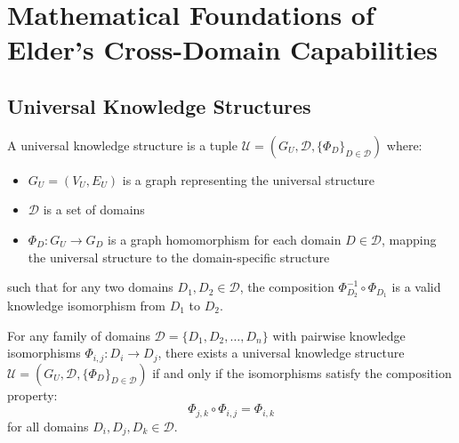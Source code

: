 \section{Mathematical Foundations of Elder's Cross-Domain Capabilities}

\subsection{Universal Knowledge Structures}

\begin{definition}
A universal knowledge structure is a tuple $\mathcal{U} = (G_U, \mathcal{D}, \{\Phi_D\}_{D \in \mathcal{D}})$ where:
\begin{itemize}
    \item $G_U = (V_U, E_U)$ is a graph representing the universal structure
    \item $\mathcal{D}$ is a set of domains
    \item $\Phi_D: G_U \to G_D$ is a graph homomorphism for each domain $D \in \mathcal{D}$, mapping the universal structure to the domain-specific structure
\end{itemize}
such that for any two domains $D_1, D_2 \in \mathcal{D}$, the composition $\Phi_{D_2}^{-1} \circ \Phi_{D_1}$ is a valid knowledge isomorphism from $D_1$ to $D_2$.
\end{definition}

\begin{theorem}
For any family of domains $\mathcal{D} = \{D_1, D_2, \ldots, D_n\}$ with pairwise knowledge isomorphisms $\Phi_{i,j}: D_i \to D_j$, there exists a universal knowledge structure $\mathcal{U} = (G_U, \mathcal{D}, \{\Phi_D\}_{D \in \mathcal{D}})$ if and only if the isomorphisms satisfy the composition property:
\begin{equation}
\Phi_{j,k} \circ \Phi_{i,j} = \Phi_{i,k}
\end{equation}
for all domains $D_i, D_j, D_k \in \mathcal{D}$.
\end{theorem}

